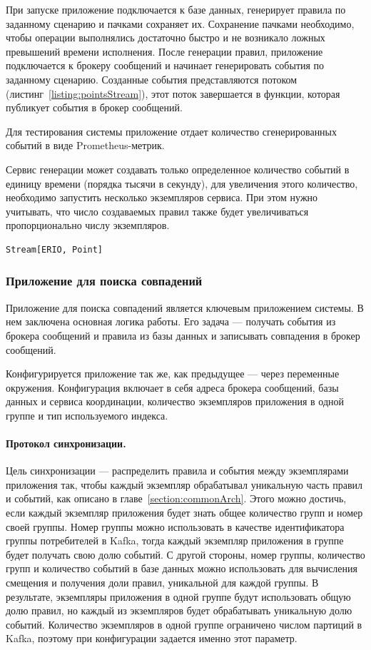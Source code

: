 \documentclass[14pt]{article}
\begin{document}
При запуске приложение подключается к базе данных, генерирует правила по заданному сценарию и пачками сохраняет их. Сохранение пачками необходимо, чтобы операции выполнялись достаточно быстро и не возникало ложных превышений времени исполнения. После генерации правил, приложение подключается к брокеру сообщений и начинает генерировать события по заданному сценарию. Созданные события представляются потоком (листинг~\ref{listing:pointsStream}), этот поток завершается в функции, которая публикует события в брокер сообщений.

Для тестирования системы приложение отдает количество сгенерированных событий в виде Prometheus-метрик.

Сервис генерации может создавать только определенное количество событий в единицу времени (порядка тысячи в секунду), для увеличения этого количество, необходимо запустить несколько экземпляров сервиса. При этом нужно учитывать, что число создаваемых правил также будет увеличиваться пропорционально числу экземпляров.

\begin{lstlisting}[style=scalaStyle,caption={Тип, описывающий поток событий.},label={listing:pointsStream},captionpos=b, float]
Stream[ERIO, Point]
\end{lstlisting}

\subsubsection{Приложение для поиска совпадений}
\label{section:classifier}

Приложение для поиска совпадений является ключевым приложением системы. В нем заключена основная логика работы. Его задача --- получать события из брокера сообщений и правила из базы данных и записывать совпадения в брокер сообщений.

Конфигурируется приложение так же, как предыдущее --- через переменные окружения. Конфигурация включает в себя адреса брокера сообщений, базы данных и сервиса координации, количество экземпляров приложения в одной группе и тип используемого индекса.

\paragraph{Протокол синхронизации.} Цель синхронизации --- распределить правила и события между экземплярами приложения так, чтобы каждый экземпляр обрабатывал уникальную часть правил и событий, как описано в главе~\ref{section:commonArch}. Этого можно достичь, если каждый экземпляр приложения будет знать общее количество групп и номер своей группы. Номер группы можно использовать в качестве идентификатора группы потребителей в Kafka, тогда каждый экземпляр приложения в группе будет получать свою долю событий. С другой стороны, номер группы, количество групп и количество событий в базе данных можно использовать для вычисления смещения и получения доли правил, уникальной для каждой группы. В результате, экземпляры приложения в одной группе будут использовать общую долю правил, но каждый из экземпляров будет обрабатывать уникальную долю событий. Количество экземпляров в одной группе ограничено числом партиций в Kafka, поэтому при конфигурации задается именно этот параметр.
\end{document}

